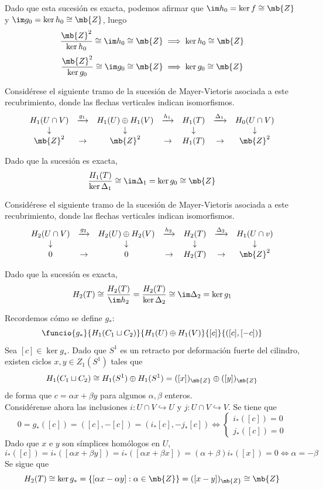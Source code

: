 Dado que esta sucesión es exacta, podemos afirmar que $\im h_0=\ker f \cong \mb{Z}$ y $\im g_0=\ker h_0\cong \mb{Z}$, luego $$\frac{\mb{Z}^2}{\ker h_0} \cong \im h_0 \cong \mb{Z} \implies \ker h_0\cong\mb{Z}$$ $$\frac{\mb{Z}^2}{\ker g_0} \cong \im g_0 \cong \mb{Z} \implies \ker g_0\cong\mb{Z}$$

Considérese el siguiente tramo de la sucesión de Mayer-Vietoris asociada a este recubrimiento, donde las flechas verticales indican isomorfismos.
\[\begin{array}{ccccccc}
H_1(U \cap V)	&\xrightarrow{g_1}	&H_1(U)\oplus H_1(V)	&\xrightarrow{h_1}	&H_1(T)		&\xrightarrow{\Delta_1}&H_0(U \cap V)\\
\downarrow		&					&\downarrow			&					&\downarrow	&					&\downarrow\\
\mb{Z}^2			&\rightarrow			&\mb{Z}^2			&\rightarrow			&H_1(T)		&\rightarrow			&\mb{Z}^2
\end{array}\]

Dado que la sucesión es exacta,
$$\frac{H_1(T)}{\ker \Delta_1}\cong \im \Delta_1=\ker g_0\cong \mb{Z}$$

Considérese el siguiente tramo de la sucesión de Mayer-Vietoris asociada a este recubrimiento, donde las flechas verticales indican isomorfismos.
\[\begin{array}{ccccccc}
H_2(U \cap V)	&\xrightarrow{g_2}	&H_2(U)\oplus H_2(V)	&\xrightarrow{h_2}	& H_2(T)		&\xrightarrow{\Delta_2}&H_1(U \cap v)\\
\downarrow		&					&\downarrow			&					&\downarrow	&					&\downarrow\\
0				&\rightarrow			&0					&\rightarrow			&H_2(T)		&\rightarrow			&\mb{Z}^2
\end{array}\]

Dado que la sucesión es exacta,
$$H_2(T) \cong \frac{H_2(T)}{\im h_2}=\frac{H_2(T)}{\ker \Delta_2} \cong \im \Delta_2=\ker g_1$$

Recordemos cómo se define $g_*$: $$\funcio{g_*}{H_1(C_1\sqcup C_2)}{H_1(U)\oplus H_1(V)}{[c]}{([c],[-c])}$$ Sea $[c] \in \ker g_*$. Dado que $S^1$ es un retracto por deformación fuerte del cilindro, existen ciclos $x,y \in Z_1(S^1)$ tales que $$H_1(C_1\sqcup C_2)\cong H_1(S^1)\oplus H_1(S^1)=([x])_\mb{Z}\oplus ([y])_\mb{Z}$$ de forma que $c=\alpha x+\beta y$ para algunos $\alpha,\beta$ enteros.
\\

Considérense ahora las inclusiones $i: U \cap V \hookrightarrow U$ y $j: U \cap V \hookrightarrow V$. Se tiene que $$0=g_*([c])=([c],-[c])=(i_*[c],-j_*[c]) \iff \begin{cases}i_*([c])=0\\j_*([c])=0\end{cases}$$ Dado que $x$ e $y$ son símplices homólogos en $U$, $$i_*([c])=i_*([\alpha x+\beta y])=i_*([\alpha x+\beta x])=(\alpha+\beta)i_*([x])=0 \iff \alpha=-\beta$$ Se sigue que $$H_2(T)\cong \ker g_*=\{[\alpha x-\alpha y]: \alpha \in \mb{Z}\}=([x-y])_\mb{Z}\cong \mb{Z}$$

